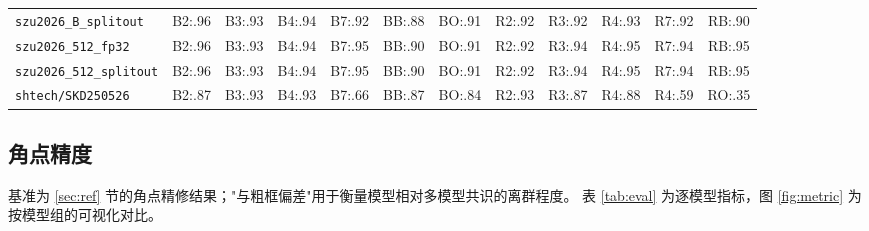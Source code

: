 \documentclass[11pt,a4paper]{ctexart}
\newcommand{\code}[1]{\texttt{\small #1}}
\newcommand{\bad}[1]{\textcolor{red!65!black}{#1}}
\begin{document}
\begin{table}[htbp]
\begin{tabular}{@{}l*{11}{c}@{}}
\code{szu2026\_B\_splitout} & B2:.96 & B3:.93 & B4:.94 & B7:.92 & BB:.88 & BO:.91 & R2:.92 & R3:.92 & R4:.93 & R7:.92 & RB:.90\\
\code{szu2026\_512\_fp32} & B2:.96 & B3:.93 & B4:.94 & B7:.95 & BB:.90 & BO:.91 & R2:.92 & R3:.94 & R4:.95 & R7:.94 & RB:.95\\
\code{szu2026\_512\_splitout} & B2:.96 & B3:.93 & B4:.94 & B7:.95 & BB:.90 & BO:.91 & R2:.92 & R3:.94 & R4:.95 & R7:.94 & RB:.95\\
\midrule
\code{shtech/SKD250526} & B2:.87 & B3:.93 & B4:.93 & B7:.66 & BB:.87 & BO:.84 & R2:.93 & R3:.87 & R4:.88 & \bad{R4:.59} & \bad{RO:.35}\\
\bottomrule
\end{tabular}
\end{table}

\subsection{角点精度}
基准为 \ref{sec:ref} 节的角点精修结果；"与粗框偏差"用于衡量模型相对多模型共识的离群程度。
表 \ref{tab:eval} 为逐模型指标，图 \ref{fig:metric} 为按模型组的可视化对比。
\end{document}
